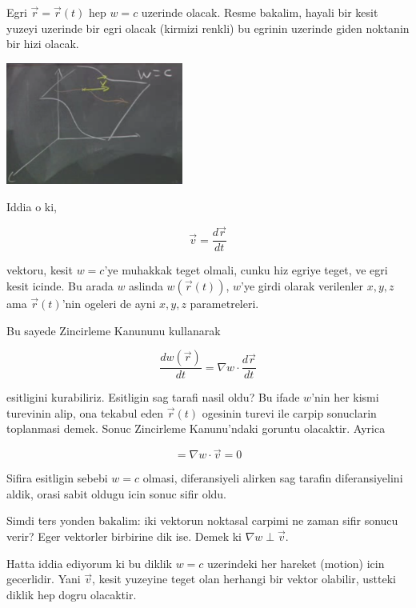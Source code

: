 \documentclass[12pt,fleqn]{article}
\begin{document}
Egri $\vec{r} = \vec{r}(t)$ hep $w = c$ uzerinde olacak. Resme bakalim,
hayali bir kesit yuzeyi uzerinde bir egri olacak (kirmizi renkli) bu
egrinin uzerinde giden noktanin bir hizi olacak. 

\includegraphics[height=4cm]{12_3.png}

Iddia o ki, 

\[ \vec{v} = \frac{d\vec{r}}{dt} \]

vektoru, kesit $w = c$'ye muhakkak teget olmali, cunku hiz egriye teget, ve
egri kesit icinde. Bu arada $w$ aslinda $w(\vec{r}(t))$, $w$'ye girdi
olarak verilenler $x,y,z$ ama $\vec{r}(t)$'nin ogeleri de ayni $x,y,z$
parametreleri. 

Bu sayede Zincirleme Kanununu kullanarak 

\[ \frac{dw(\vec{r})}{dt} = \nabla w \cdot \frac{d\vec{r}}{dt} \]

esitligini kurabiliriz. Esitligin sag tarafi nasil oldu? Bu ifade $w$'nin
her kismi turevinin alip, ona tekabul eden $\vec{r}(t)$ ogesinin turevi ile
carpip sonuclarin toplanmasi demek. Sonuc Zincirleme Kanunu'ndaki goruntu
olacaktir. Ayrica

\[  = \nabla w \cdot \vec{v} = 0\]

Sifira esitligin sebebi $w = c$ olmasi, diferansiyeli alirken sag tarafin
diferansiyelini aldik, orasi sabit oldugu icin sonuc sifir oldu. 

Simdi ters yonden bakalim: iki vektorun noktasal carpimi ne zaman sifir
sonucu verir? Eger vektorler birbirine dik ise. Demek ki $\nabla w \perp
\vec{v}$. 

Hatta iddia ediyorum ki bu diklik $w=c$ uzerindeki her hareket (motion)
icin gecerlidir. Yani $\vec{v}$, kesit yuzeyine teget olan herhangi bir
vektor olabilir, ustteki diklik hep dogru olacaktir.
\end{document}
